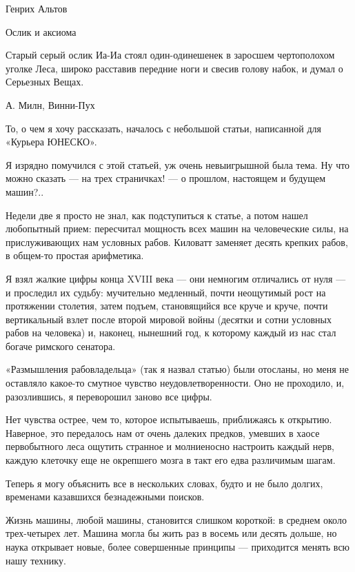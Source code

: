 
                                 Генрих Альтов

                                Ослик и аксиома


   Старый серый  ослик Иа-Иа  стоял один-одинешенек  в заросшем  чертополохом
   уголке Леса, широко расставив передние ноги и свесив голову набок, и думал
   о Серьезных Вещах.

   А. Милн, Винни-Пух

   То, о чем я хочу рассказать,  началось с небольшой статьи, написанной  для
   «Курьера ЮНЕСКО».

   Я изрядно помучился с  этой статьей, уж очень  невыигрышной была тема.  Ну
   что можно сказать — на трех  страничках! — о прошлом, настоящем и  будущем
   машин?..

   Недели две я  просто не  знал, как подступиться  к статье,  а потом  нашел
   любопытный прием: пересчитал мощность всех машин на человеческие силы,  на
   прислуживающих нам условных рабов. Киловатт заменяет десять крепких рабов,
   в общем-то простая арифметика.

   Я взял жалкие цифры конца XVIII века — они немногим отличались от нуля — и
   проследил их  судьбу:  мучительно  медленный,  почти  неощутимый  рост  на
   протяжении столетия, затем подъем, становящийся  все круче и круче,  почти
   вертикальный взлет после  второй мировой войны  (десятки и сотни  условных
   рабов на человека) и, наконец, нынешний год, к которому каждый из нас стал
   богаче римского сенатора.

   «Размышления рабовладельца» (так я назвал  статью) были отосланы, но  меня
   не  оставляло  какое-то  смутное   чувство  неудовлетворенности.  Оно   не
   проходило, и, разозлившись, я переворошил заново все цифры.

   Нет чувства острее, чем то,  которое испытываешь, приближаясь к  открытию.
   Наверное, это передалось  нам от  очень далеких предков,  умевших в  хаосе
   первобытного леса ощутить  странное и молниеносно  настроить каждый  нерв,
   каждую клеточку еще не окрепшего мозга в такт его едва различимым шагам.

   Теперь я могу объяснить все в  нескольких словах, будто и не было  долгих,
   временами казавшихся безнадежными поисков.

   Жизнь машины, любой машины, становится  слишком короткой: в среднем  около
   трех-четырех лет. Машина могла бы жить раз в восемь или десять дольше,  но
   наука открывает новые, более совершенные принципы — приходится менять  всю
   нашу технику.

